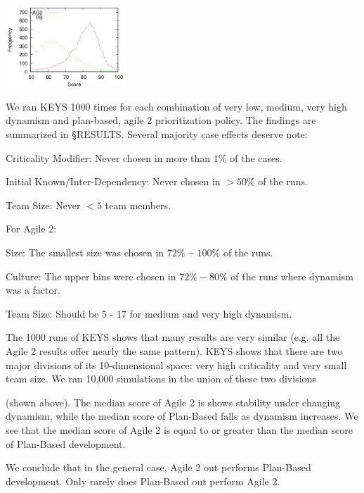 \begin{kasten}
{\begin{minipage}{4.5cm}
\begin{center}
{{            \includegraphics[width=4.5cm]{fr-v-sc-msvh.eps}
            }}
          \end{center}
      \end{minipage}
      \begin{minipage}{8.5cm}
        We ran KEYS 1000 times for each combination of {very low, medium, very high} dynamism and {plan-based, agile 2} prioritization policy. The findings are summarized in \S{RESULTS}. Several majority case effects deserve note:
        \vspace{-0.8em}
        \begin{verysmallitem}
        \item Criticality Modifier: Never chosen in more than $1\%$ of the cases.
        \item Initial Known$/$Inter-Dependency: Never chosen in $>50\%$ of the runs.
        \item Team Size: Never $<5$ team members.
        \item For Agile 2:
          \vspace{-0.7em}
          \begin{verysmallitem}
          \item Size: The smallest size was chosen in $72\%-100\%$ of the runs.
          \item Culture: The upper bins were chosen in $72\%-80\%$ of the runs where dynamism was a factor.
          \item Team Size: Should be 5 - 17 for medium and very high dynamism.
          \end{verysmallitem}
        \end{verysmallitem}

\vspace{-0.8em}
The 1000 runs of KEYS shows that many
results are very similar (e.g. all the Agile 2
          results offer nearly the same pattern). 
KEYS shows that there are two major divisions of 
its 10-dimensional space: very high criticality 
and very small team size. We ran 10,000 
simulations in the union of these two divisions
      \end{minipage}
    }

 (shown above). The median score of Agile 
2 is shows stability under changing dynamism, while 
the median score of Plan-Based falls  as dynamism increases. We see that the median score of Agile 2 is equal to or greater than the median score of Plan-Based development.

    \vspace{3mm}
    We conclude that in the general case, Agile 2 out performs Plan-Based development. Only rarely does Plan-Based out perform Agile 2.
    \vspace{-0.1em}
\end{kasten}

